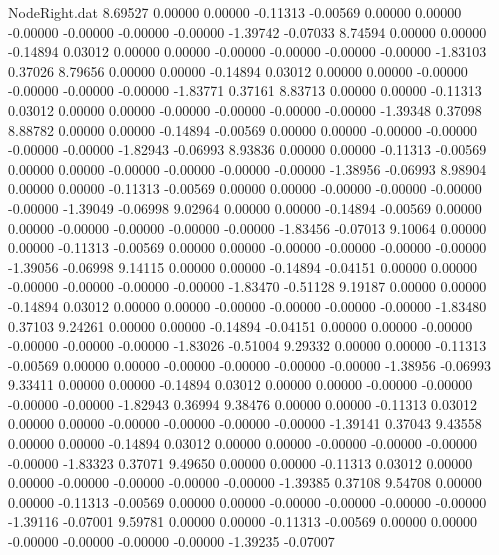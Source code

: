 \begin{filecontents}{NodeRight.dat}
   8.69527    0.00000    0.00000    -0.11313   -0.00569    0.00000    0.00000   -0.00000   -0.00000   -0.00000   -0.00000   -1.39742   -0.07033
   8.74594    0.00000    0.00000    -0.14894    0.03012    0.00000    0.00000   -0.00000   -0.00000   -0.00000   -0.00000   -1.83103    0.37026
   8.79656    0.00000    0.00000    -0.14894    0.03012    0.00000    0.00000   -0.00000   -0.00000   -0.00000   -0.00000   -1.83771    0.37161
   8.83713    0.00000    0.00000    -0.11313    0.03012    0.00000    0.00000   -0.00000   -0.00000   -0.00000   -0.00000   -1.39348    0.37098
   8.88782    0.00000    0.00000    -0.14894   -0.00569    0.00000    0.00000   -0.00000   -0.00000   -0.00000   -0.00000   -1.82943   -0.06993
   8.93836    0.00000    0.00000    -0.11313   -0.00569    0.00000    0.00000   -0.00000   -0.00000   -0.00000   -0.00000   -1.38956   -0.06993
   8.98904    0.00000    0.00000    -0.11313   -0.00569    0.00000    0.00000   -0.00000   -0.00000   -0.00000   -0.00000   -1.39049   -0.06998
   9.02964    0.00000    0.00000    -0.14894   -0.00569    0.00000    0.00000   -0.00000   -0.00000   -0.00000   -0.00000   -1.83456   -0.07013
   9.10064    0.00000    0.00000    -0.11313   -0.00569    0.00000    0.00000   -0.00000   -0.00000   -0.00000   -0.00000   -1.39056   -0.06998
   9.14115    0.00000    0.00000    -0.14894   -0.04151    0.00000    0.00000   -0.00000   -0.00000   -0.00000   -0.00000   -1.83470   -0.51128
   9.19187    0.00000    0.00000    -0.14894    0.03012    0.00000    0.00000   -0.00000   -0.00000   -0.00000   -0.00000   -1.83480    0.37103
   9.24261    0.00000    0.00000    -0.14894   -0.04151    0.00000    0.00000   -0.00000   -0.00000   -0.00000   -0.00000   -1.83026   -0.51004
   9.29332    0.00000    0.00000    -0.11313   -0.00569    0.00000    0.00000   -0.00000   -0.00000   -0.00000   -0.00000   -1.38956   -0.06993
   9.33411    0.00000    0.00000    -0.14894    0.03012    0.00000    0.00000   -0.00000   -0.00000   -0.00000   -0.00000   -1.82943    0.36994
   9.38476    0.00000    0.00000    -0.11313    0.03012    0.00000    0.00000   -0.00000   -0.00000   -0.00000   -0.00000   -1.39141    0.37043
   9.43558    0.00000    0.00000    -0.14894    0.03012    0.00000    0.00000   -0.00000   -0.00000   -0.00000   -0.00000   -1.83323    0.37071
   9.49650    0.00000    0.00000    -0.11313    0.03012    0.00000    0.00000   -0.00000   -0.00000   -0.00000   -0.00000   -1.39385    0.37108
   9.54708    0.00000    0.00000    -0.11313   -0.00569    0.00000    0.00000   -0.00000   -0.00000   -0.00000   -0.00000   -1.39116   -0.07001
   9.59781    0.00000    0.00000    -0.11313   -0.00569    0.00000    0.00000   -0.00000   -0.00000   -0.00000   -0.00000   -1.39235   -0.07007

\end{filecontents}
